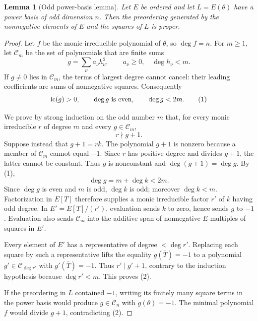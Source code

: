 \documentclass[uplatex,dvipdfmx]{jsarticle}
\newtheorem{lemma}[theorem]{Lemma}
\theoremstyle{definition}
\theoremstyle{remark}
\begin{document}
\begin{lemma}[Odd power-basis lemma]\label{lem:odd-power-basis}
Let $E$ be ordered and let $L=E(\theta)$ have a power basis of odd dimension
$n$.  Then the preordering generated by the nonnegative elements of $E$ and
the squares of $L$ is proper.
\end{lemma}
\begin{proof}
Let $f$ be the monic irreducible polynomial of $\theta$, so $\deg f=n$.
For $m\ge1$, let $\mathcal C_m$ be the set of polynomials that are finite sums
\[
  g=\sum_\nu a_\nu h_\nu^2,\qquad
  a_\nu\ge0,\quad \deg h_\nu<m.
\]
If $g\ne0$ lies in $\mathcal C_m$, the terms of largest degree cannot cancel:
their leading coefficients are sums of nonnegative squares.  Consequently
\[
  \operatorname{lc}(g)>0,\qquad
  \deg g\ \hbox{is even},\qquad
  \deg g<2m.                                      \tag{1}
\]

We prove by strong induction on the odd number $m$ that, for every monic
irreducible $r$ of degree $m$ and every $g\in\mathcal C_m$,
\[
  r\nmid g+1.                                      \tag{2}
\]
Suppose instead that $g+1=rk$.  The polynomial $g+1$ is nonzero because a
member of $\mathcal C_m$ cannot equal $-1$.  Since $r$ has positive
degree and divides $g+1$, the latter cannot be constant.  Thus $g$ is
nonconstant and $\deg(g+1)=\deg g$.  By (1),
\[
  \deg g=m+\deg k<2m.
\]
Since $\deg g$ is even and $m$ is odd, $\deg k$ is odd; moreover
$\deg k<m$.  Factorization in $E[T]$ therefore supplies a monic irreducible
factor $r'$ of $k$ having odd degree.  In
$E'=E[T]/(r')$, evaluation sends $k$ to zero, hence sends $g$ to $-1$.
Evaluation also sends $\mathcal C_m$ into the additive span of nonnegative
$E$-multiples of squares in $E'$.

Every element of $E'$ has a representative of degree $<\deg r'$.  Replacing
each square by such a representative lifts the equality $g(\bar T)=-1$ to a
polynomial $g'\in\mathcal C_{\deg r'}$ with
$g'(\bar T)=-1$.  Thus $r'\mid g'+1$, contrary to the induction hypothesis
because $\deg r'<m$.  This proves (2).

If the preordering in $L$ contained $-1$, writing its finitely many square
terms in the power basis would produce $g\in\mathcal C_n$ with
$g(\theta)=-1$.  The minimal polynomial $f$ would divide $g+1$, contradicting
(2).
\end{proof}
\end{document}
